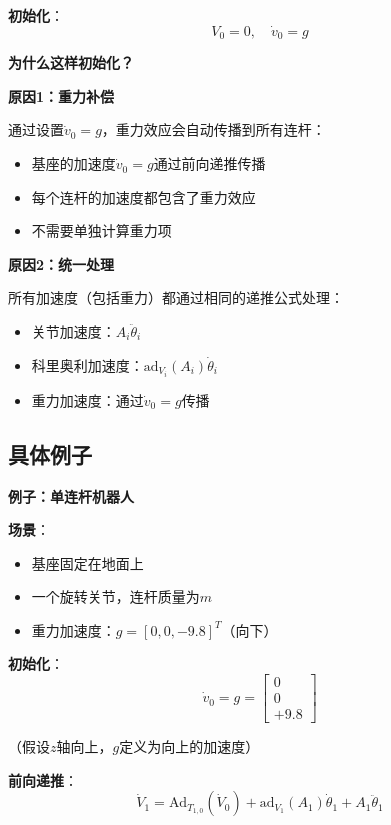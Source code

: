 \documentclass[12pt,a4paper]{article}
\begin{document}
\textbf{初始化}：
\begin{equation}
V_0 = 0, \quad \dot{v}_0 = g
\end{equation}

\textbf{为什么这样初始化？}

\textbf{原因1：重力补偿}

通过设置$\dot{v}_0 = g$，重力效应会自动传播到所有连杆：
\begin{itemize}
\item 基座的加速度$\dot{v}_0 = g$通过前向递推传播
\item 每个连杆的加速度都包含了重力效应
\item 不需要单独计算重力项
\end{itemize}

\textbf{原因2：统一处理}

所有加速度（包括重力）都通过相同的递推公式处理：
\begin{itemize}
\item 关节加速度：$A_i \ddot{\theta}_i$
\item 科里奥利加速度：$\text{ad}_{V_i}(A_i)\dot{\theta}_i$
\item 重力加速度：通过$\dot{v}_0 = g$传播
\end{itemize}

\subsection{具体例子}

\textbf{例子：单连杆机器人}

\textbf{场景}：
\begin{itemize}
\item 基座固定在地面上
\item 一个旋转关节，连杆质量为$m$
\item 重力加速度：$g = [0, 0, -9.8]^T$（向下）
\end{itemize}

\textbf{初始化}：
\begin{equation}
\dot{v}_0 = g = \begin{bmatrix} 0 \\ 0 \\ +9.8 \end{bmatrix}
\end{equation}

（假设$z$轴向上，$g$定义为向上的加速度）

\textbf{前向递推}：
\begin{equation}
\dot{V}_1 = \text{Ad}_{T_{1,0}}(\dot{V}_0) + \text{ad}_{V_1}(A_1)\dot{\theta}_1 + A_1 \ddot{\theta}_1
\end{equation}
\end{document}
